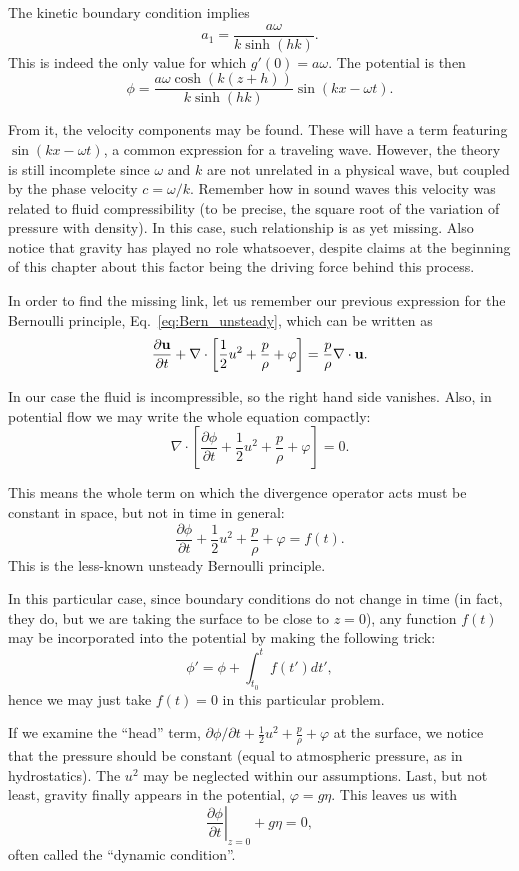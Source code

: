 The kinetic boundary condition implies
\[
a_1 = \frac{a \omega}{ k \sinh(hk)  } .
\]
This is indeed the only value for which $g'(0)= a \omega $. The
potential is then
\[
\phi = \frac{a \omega  \cosh(k(z+h)) }{ k \sinh(hk)  }  \sin(kx -\omega t ) .
\]

From it, the velocity components may be found. These will have a term
featuring $\sin(kx -\omega t )$, a common expression for a traveling
wave. However, the theory is still incomplete since $\omega$ and $k$
are not unrelated in a physical wave, but coupled by the phase
velocity $c=\omega / k$. Remember how in sound waves this velocity was
related to fluid compressibility (to be precise, the square root of
the variation of pressure with density). In this case, such
relationship is as yet missing. Also notice that gravity has played no
role whatsoever, despite claims at the beginning of this chapter about
this factor being the driving force behind this process.

In order to find the missing link, let us remember our previous
expression for the Bernoulli principle, Eq.~\ref{eq:Bern_unsteady},
which can be written as
\[
\frac{\partial \mathbf{u}}{\partial t} +
\nabla \cdot \left[
  \frac12 u^2 + \frac{p}{\rho} + \varphi
  \right] =  \frac{p}{\rho}\nabla \cdot \mathbf{u} .
\]

In our case the fluid is incompressible, so the right hand side
vanishes. Also, in potential flow we may write the whole equation
compactly:
\[
\nabla \cdot \left[
  \frac{\partial \phi}{\partial t} +
  \frac12 u^2 + \frac{p}{\rho} + \varphi
  \right] =  0 .
\]

This means the whole term on which the divergence operator acts
must be constant in space, but not in time in general:
\[
  \frac{\partial \phi}{\partial t} +
  \frac12 u^2 + \frac{p}{\rho} + \varphi =  f(t) .
\]
This is the less-known unsteady Bernoulli principle.

In this particular case, since boundary conditions do not change in
time (in fact, they do, but we are taking the surface to be close to
$z=0$), any function $f(t)$ may be incorporated into the potential
by making the following trick:
\[
\phi' = \phi + \int_{t_0}^t f(t') dt' ,
\]
hence we may just take $f(t)=0$ in this particular problem.

If we examine the ``head'' term, $ \partial \phi / \partial t +
\frac12 u^2 + \frac{p}{\rho} + \varphi$ at the surface, we notice that
the pressure should be constant (equal to atmospheric pressure, as in
hydrostatics). The $u^2$ may be neglected within our
assumptions. Last, but not least, gravity finally appears in the
potential, $\varphi = g \eta $. This leaves us with
\[
\left.\frac{\partial \phi}{\partial t}\right|_{z=0} + g \eta = 0 ,
\]
often called the ``dynamic condition''. 

